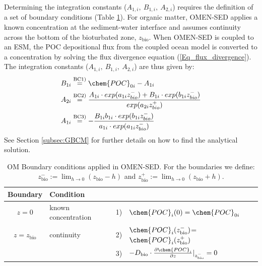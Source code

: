 \documentclass[gmd, manuscript]{copernicus}
\begin{document}
Determining the integration constants ($A_{1,i},\ B_{1,i},\ A_{2,i}$) requires the definition of a set of boundary conditions (Table \ref{Tab:BC_OM}). 
For organic matter, OMEN-SED applies a known concentration at the sediment-water interface and assumes continuity across the bottom of the bioturbated zone, $z_{\mathrm{bio}}$. 
When OMEN-SED is coupled to an ESM, the POC depositional flux from the coupled ocean model is converted to a concentration by solving the flux divergence equation (\ref{Eq_flux_divergence}). 
The integration constants ($A_{1,i},\ B_{1,i},\ A_{2,i}$) are thus given by:
\begin{align}
B_{1i} &\overset{\mathrm{BC 1)}}{=} \chem{POC}_{0i} - A_{1i} \label{POC_IntConst_B1i}\\
A_{2i} &\overset{\mathrm{BC 2)}}{=} \frac{A_{1i}\cdot exp(a_{1i} z_{bio}^-)+B_{1i}\cdot exp(b_{1i} z_{bio}^-)}{exp(a_{2i} z_{bio}^+)}\notag\\
A_{1i} &\overset{\mathrm{BC 3)}}{=} - \frac{B_{1i}b_{1i}\cdot exp(b_{1i} z_{bio}^-)}{a_{1i} \cdot exp(a_{1i} z_{bio}^-)}\notag
\end{align}
See Section \ref{subsec:GBCM} for further details on how to find the analytical solution.

\begin{table}[tbp]
\caption{OM Boundary conditions applied in OMEN-SED. For the boundaries we define:  $z_{\mathrm{bio}}^- := \lim_{h\to0} (z_{\mathrm{bio}}-h)$ and $z_{\mathrm{bio}}^+ := \lim_{h\to0} (z_{\mathrm{bio}}+h)$.}
\centering
\begin{tabular}{ |c| l| c l|}
\hline
\textbf{Boundary}& \textbf{Condition}& &\\
\hline
$z=0$& known concentration& 1)& $\chem{POC}_i(0)=\chem{POC}_{0i}$\\
$z=z_{\mathrm{bio}}$&continuity& 2)& $\chem{POC}_i(z_{\mathrm{bio}}^-)$=$\chem{POC}_i(z_{\mathrm{bio}}^+)$\\
               &&3)&$-D_{\mathrm{bio}}\cdot \frac{\partial \chem{POC}_i}{\partial z}|_{z_{\mathrm{bio}}^-}=0$\\
\hline
\end{tabular}
\label{Tab:BC_OM}
\end{table}
\end{document}

